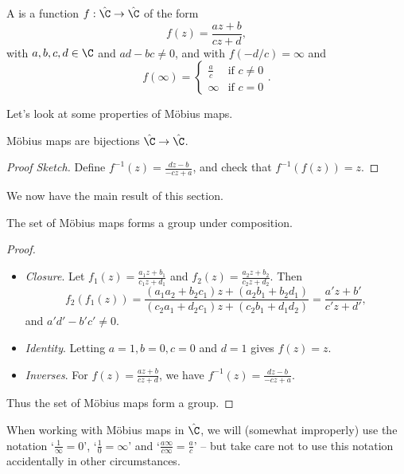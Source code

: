 \documentclass[a4]{scrreprt}
\begin{document}
\begin{definition}
	A  is a function $f : \hat{\C} \rightarrow \hat{\C}$ of the form
	$$
	f(z) = \frac{az + b}{cz + d},
	$$
	with $a, b, c, d \in \C$ and $ad - bc \neq 0$, and with $f(-d/c) = \infty$ and 
	$$
	f(\infty) = \begin{cases}
	   \frac{a}{c} &\mbox{if } c \neq 0 \\
	   \infty &\mbox{if } c = 0
	   \end{cases}.
	$$
\end{definition}

Let's look at some properties of Möbius maps.

\begin{proposition}
	Möbius maps are bijections $\hat{\C} \rightarrow \hat{\C}$.
\end{proposition}
\begin{proof}[Proof Sketch]
	Define $f^{-1}(z) = \frac{dz - b}{-cz + a}$, and check that $f^{-1}(f(z)) = z$.
\end{proof}

We now have the main result of this section.

\begin{theorem}
	The set of Möbius maps forms a group under composition.
\end{theorem}
\begin{proof}$ $
	\begin{itemize}
		\item \emph{Closure}. Let $f_1(z) = \frac{a_1 z + b_1}{c_1 z + d_1}$ and $f_2(z) = \frac{a_2 z + b_2}{c_2 z + d_2}$. Then
		$$
		f_2(f_1(z)) = \frac{(a_1 a_2 + b_2 c_1)z + (a_2 b_1 + b_2 d_1)}{(c_2 a_1 + d_2 c_1)z + (c_2 b_1+ d_1 d_2)} = \frac{a' z + b'}{c' z + d'},
		$$
		and $a' d' - b' c' \neq 0$.
		\item \emph{Identity}. Letting $a = 1, b = 0, c = 0$ and $d = 1$ gives $f(z) = z$.
		\item \emph{Inverses}. For $f(z) = \frac{az + b}{cz + d}$, we have $f^{-1}(z) = \frac{dz - b}{-cz + a}$. 
	\end{itemize}
	Thus the set of Möbius maps form a group.
\end{proof}

\begin{remark}
	When working with Möbius maps in $\hat{\C}$, we will (somewhat improperly) use the notation `$\frac{1}{\infty} = 0$', `$\frac{1}{0} = \infty$' and `$\frac{a\infty}{c \infty} = \frac{a}{c}$' -- but take care not to use this notation accidentally in other circumstances.
\end{remark}
\end{document}
